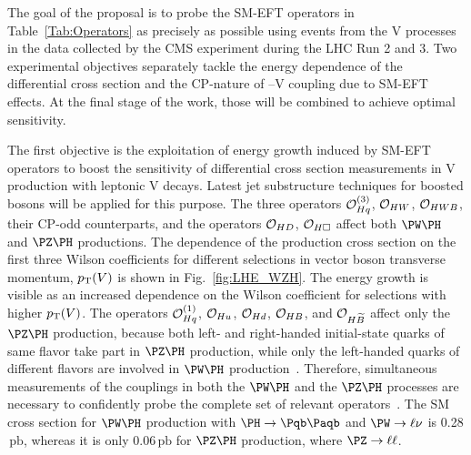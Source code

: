 \documentclass[a4paper,11pt]{article}
\newcommand{\Pb}{{{\Pqb}}\xspace}
\newcommand{\PAb}{{{{\Paqb}}}\xspace}
\renewcommand{\PV}{{{{V}}}\xspace}
\newcommand{\VH}{{{\PV}{\PH}}\xspace}
\newcommand{\pb} {\mbox{\ensuremath{\,\text{pb}}}\xspace}
\begin{document}
The goal of the proposal is to probe the SM-EFT operators in Table~\ref{Tab:Operators} as precisely as possible using events from the \VH processes in the data collected by the CMS experiment during the LHC Run 2 and 3. 
Two experimental objectives separately tackle the energy dependence of the differential cross section and the CP-nature of \PH--\PV coupling due to SM-EFT effects.
At the final stage of the work, those will be combined to achieve optimal sensitivity.

The first objective is the exploitation of energy growth
induced by SM-EFT operators
to boost the sensitivity of differential cross section measurements in \VH production with leptonic \PV decays.
Latest jet substructure techniques for boosted \PH bosons will be applied for this purpose.
The three operators ${\cal O}^{(3)}_{Hq}$, ${\cal O}_{HW}$, ${\cal O}_{HWB}$, their CP-odd counterparts, and the operators ${\cal O}_{HD}$, ${\cal O}_{H\square}$ affect both $\PW\PH$ and $\PZ\PH$ productions. 
The dependence of the production cross section on the first three Wilson coefficients for different selections in vector boson transverse momentum, $\pt(\PV)$ is shown in Fig.~\ref{fig:LHE_WZH}. 
The energy growth is visible as an increased dependence on the Wilson coefficient for selections with higher $\pt(\PV)$. %
The operators ${\cal O}^{(1)}_{Hq}$, ${\cal O}_{Hu}$, ${\cal O}_{Hd}$, ${\cal O}_{HB}$, and ${\cal O}_{H\widetilde{B}}$ affect only the $\PZ\PH$ production, 
because both left- and right-handed initial-state quarks of same flavor take part in $\PZ\PH$ production, while only the left-handed quarks of different flavors are involved in $\PW\PH$ production~\cite{Falkowski:2014tna,Banerjee:2018bio}. 
Therefore, simultaneous measurements of the couplings in both the $\PW\PH$ and the $\PZ\PH$ processes are necessary to confidently probe the complete set of relevant operators~\cite{Banerjee:2019twi}.
The SM cross section for $\PW\PH$ production with  $\PH\rightarrow\Pb\PAb$ and $\PW\rightarrow\ell\nu$  is 0.28\pb, whereas it is only 0.06\pb for $\PZ\PH$ production, where $\PZ\rightarrow\ell\ell$.
\end{document}
